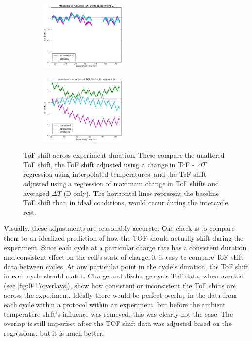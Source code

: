 \begin{figure}[t!]\label{fig:adj}
\centering
     \begin{subfigure}
         \centering
         \includegraphics[width=0.48\textwidth]{Thesis/0409adj.png}
     \end{subfigure}
     \hfill
     \begin{subfigure}
         \centering
         \includegraphics[width=0.48\textwidth]{Thesis/0417adj.png}
     \end{subfigure}
     \caption{ToF shift across experiment duration. These compare the unaltered ToF shift, the ToF shift adjusted using a change in ToF - $\Delta T$ regression using interpolated temperatures, and the ToF shift adjusted using a regression of maximum change in ToF shifts and averaged $\Delta T$ (D only). The horizontal lines represent the baseline ToF shift that, in ideal conditions, would occur during the intercycle rest.}
\end{figure}

Visually, these adjustments are reasonably accurate. 
One check is to compare them to an idealized prediction of how the TOF should actually shift during the experiment. 
Since each cycle at a particular charge rate has a consistent duration and consistent effect on the cell's state of charge, it is easy to compare ToF shift data between cycles. 
At any particular point in the cycle's duration, the ToF shift in each cycle should match. Charge and discharge cycle ToF data, when overlaid (see \hyperref[fig:0417overlays]{\cref{fig:0417overlays}}), show how consistent or inconsistent the ToF shifts are across the experiment.
Ideally there would be perfect overlap in the data from each cycle within a protocol within an experiment, but before the ambient temperature shift's influence was removed, this was clearly not the case. 
The overlap is still imperfect after the TOF shift data was adjusted based on the regressions, but it is much better.

